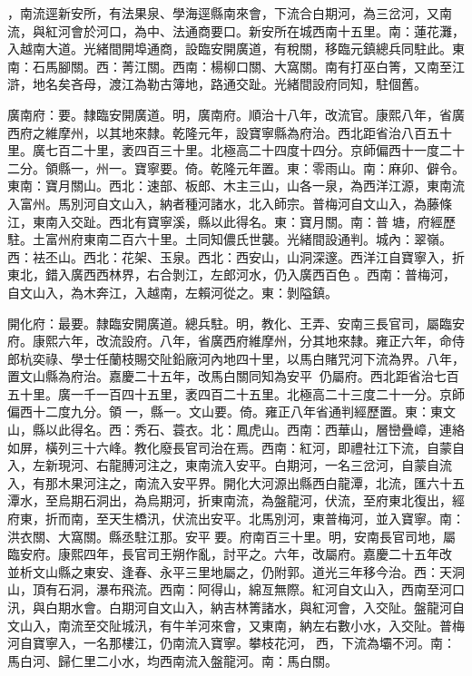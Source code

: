 \begin{pinyinscope}
，南流逕新安所，有法果泉、學海逕縣南來會，下流合白期河，為三岔河，又南流，與紅河會於河口，為中、法通商要口。新安所在城西南十五里。南：蓮花灘，入越南大道。光緒間開埠通商，設臨安開廣道，有稅關，移臨元鎮總兵同駐此。東南：石馬腳關。西：菁江關。西南：楊柳口關、大窩關。南有打巫白箐，又南至江滸，地名矣吝母，渡江為勒古簿地，路通交趾。光緒間設府同知，駐個舊。

廣南府：要。隸臨安開廣道。明，廣南府。順治十八年，改流官。康熙八年，省廣西府之維摩州，以其地來隸。乾隆元年，設寶寧縣為府治。西北距省治八百五十里。廣七百二十里，袤四百三十里。北極高二十四度十四分。京師偏西十一度二十二分。領縣一，州一。寶寧要。倚。乾隆元年置。東：零雨山。南：麻卯、僻令。東南：寶月關山。西北：速部、板郎、木主三山，山各一泉，為西洋江源，東南流入富州。馬別河自文山入，納者種河諸水，北入師宗。普梅河自文山入，為藤條江，東南入交趾。西北有寶寧溪，縣以此得名。東：寶月關。南：普塘，府經歷駐。土富州府東南二百六十里。土同知儂氏世襲。光緒間設通判。城內：翠嶺。西：袪丕山。西北：花架、玉泉。西北：西安山，山洞深邃。西洋江自寶寧入，折東北，錯入廣西西林界，右合剝江，左郎河水，仍入廣西百色。西南：普梅河，自文山入，為木奔江，入越南，左賴河從之。東：剝隘鎮。

開化府：最要。隸臨安開廣道。總兵駐。明，教化、王弄、安南三長官司，屬臨安府。康熙六年，改流設府。八年，省廣西府維摩州，分其地來隸。雍正六年，命侍郎杭奕祿、學士任蘭枝賜交阯鉛廠河內地四十里，以馬白賭咒河下流為界。八年，置文山縣為府治。嘉慶二十五年，改馬白關同知為安平，仍屬府。西北距省治七百五十里。廣一千一百四十五里，袤四百二十五里。北極高二十三度二十一分。京師偏西十二度九分。領一，縣一。文山要。倚。雍正八年省通判經歷置。東：東文山，縣以此得名。西：秀石、蓑衣。北：鳳虎山。西南：西華山，層巒疊嶂，連絡如屏，橫列三十六峰。教化廢長官司治在焉。西南：紅河，即禮社江下流，自蒙自入，左新現河、右龍膊河注之，東南流入安平。白期河，一名三岔河，自蒙自流入，有那木果河注之，南流入安平界。開化大河源出縣西白龍潭，北流，匯六十五潭水，至烏期石洞出，為烏期河，折東南流，為盤龍河，伏流，至府東北復出，經府東，折而南，至天生橋汛，伏流出安平。北馬別河，東普梅河，並入寶寧。南：洪衣關、大窩關。縣丞駐江那。安平要。府南百三十里。明，安南長官司地，屬臨安府。康熙四年，長官司王朔作亂，討平之。六年，改屬府。嘉慶二十五年改，並析文山縣之東安、逢春、永平三里地屬之，仍附郭。道光三年移今治。西：天洞山，頂有石洞，瀑布飛流。西南：阿得山，綿亙無際。紅河自文山入，西南至河口汛，與白期水會。白期河自文山入，納吉林箐諸水，與紅河會，入交阯。盤龍河自文山入，南流至交阯城汛，有牛羊河來會，又東南，納左右數小水，入交阯。普梅河自寶寧入，一名那樓江，仍南流入寶寧。攀枝花河，西，下流為壩不河。南：馬白河、歸仁里二小水，均西南流入盤龍河。南：馬白關。


\end{pinyinscope}
